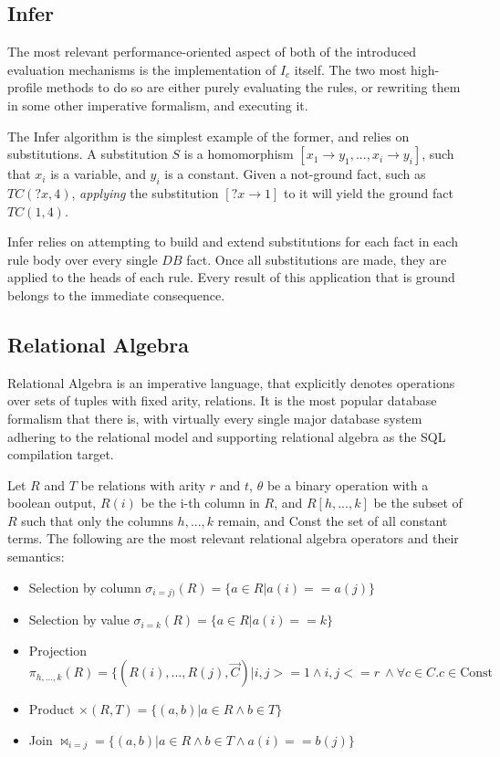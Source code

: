 \documentclass[manuscript,screen,review]{acmart}
\theoremstyle{definition}
\begin{document}
\subsection{Infer}
The most relevant performance-oriented aspect of both of the introduced evaluation mechanisms is the implementation of $I_c$ itself. The two
most high-profile methods to do so are either purely evaluating the rules, or rewriting them in some other imperative formalism, and executing it.

The Infer\cite{datalog} algorithm is the simplest example of the former, and relies on substitutions. A substitution $S$ is a homomorphism
$[x_1 \rightarrow y_1, ..., x_i \rightarrow y_i]$, such that $x_i$ is a variable, and $y_i$ is a constant. Given a not-ground fact,
such as $TC(?x, 4)$, \textit{applying} the substitution $[?x \rightarrow 1]$ to it will yield the ground fact $TC(1, 4)$.

Infer relies on attempting to build and extend substitutions for each fact in each rule body over every single $DB$ fact. Once
all substitutions are made, they are applied to the heads of each rule. Every result of this application that is ground belongs
to the immediate consequence.

\subsection{Relational Algebra}
Relational Algebra\cite{codd_1970} is an imperative language, that explicitly denotes operations over sets of tuples with fixed arity, relations. It is
the most popular database formalism that there is, with virtually every single major database system adhering to the relational model\cite{pg,mysql,sqlserver}
and supporting relational algebra as the SQL compilation target.

Let $R$ and $T$ be relations with arity $r$ and $t$, $\theta$ be a binary operation with a boolean output, $R(i)$ be the i-th column in $R$, and
$R[h, ..., k]$ be the subset of $R$ such that only the columns $h, ..., k$ remain, and Const the set of all constant terms. The following
are the most relevant relational algebra operators and their semantics:
\begin{itemize}
	\item Selection by column $\sigma_{i=j)}(R) = \{ a \in R | a(i) == a(j) \}$
	\item Selection by value $\sigma_{i=k}(R) = \{a \in R | a(i) == k \}$
	\item Projection $\pi_{h, ..., k}(R) = \{(R(i), ..., R(j), \overrightarrow{C}) |  i, j >= 1 \wedge i, j <= r\ \wedge \forall c \in C. c \in \text{Const}$
	\item Product $\times(R, T) = \{(a, b) | a \in R \wedge b \in T \}$
	\item Join $\Join_{i=j} = \{(a, b) | a \in R \wedge b \in T \wedge a(i) == b(j)\}$
\end{itemize}
\end{document}
